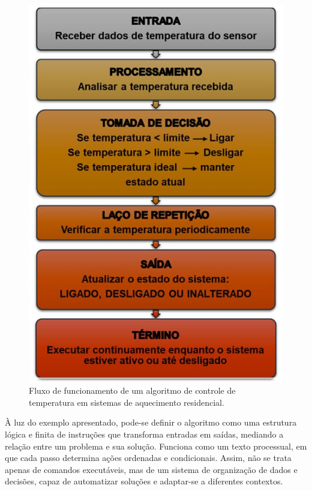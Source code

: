 \documentclass[portuguese]{textolivre}
\begin{document}
\begin{figure}[h!]
    \centering
    \begin{minipage}{0.5\linewidth}
    \includegraphics[width=\linewidth]{Fig1.png}
    \caption{Fluxo de funcionamento de um algoritmo de controle de temperatura em sistemas de aquecimento residencial.}
    \label{fig1}
    \end{minipage}
\end{figure}

À luz do exemplo apresentado, pode-se definir o algoritmo como uma estrutura lógica e finita de instruções que transforma entradas em saídas, mediando a relação entre um problema e sua solução. Funciona como um texto processual, em que cada passo determina ações ordenadas e condicionais. Assim, não se trata apenas de comandos executáveis, mas de um sistema de organização de dados e decisões, capaz de automatizar soluções e adaptar-se a diferentes contextos.
\end{document}
